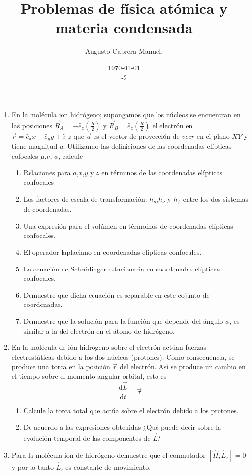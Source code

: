 \documentclass[]{article}
\title{Problemas de física atómica y materia condensada}
\author{Augusto Cabrera Manuel.}
\date{\today\\ \ser 5 \sem 2018-2 }
\begin{document}
\maketitle
\begin{enumerate}
\item En la molécula ion hidrógeno; supongamos que los núcleos se encuentran en las posiciones $\vec{R}_A=-\hat{e}_z\left(\frac{R}{2}\right)$ y $\vec{R}_B=\hat{e}_z\left(\frac{R}{2}\right)$ el electrón en $\vec{r}=\hat{e}_xx+\hat{e}_yy+\hat{e}_zz$ que $\vec{a}$ es el vector de proyección de $vec{r}$ en el plano $XY$ y tiene magnitud $a$. Utilizando las definiciones de las coordenadas elípticas cofocales $\mu$,$\nu$, $\phi$, calcule
  \begin{enumerate}
  \item Relaciones para $a$,$x$,$y$ y $z$ en términos de las coordenadas elípticas confocales
  \item Los factores de escala de transformación: $h_{\mu}$,$h_{\nu}$ y $h_{\phi}$ entre los dos sistemas de coordenadas.
  \item Una expresión para el volúmen en térmoinos de coordenadas elípticas confocales.
  \item El operador laplaciano en coordenadas elípticas confocales.
  \item La ecuación de Schrödinger estacionaria en coordenadas elípticas confocales.
  \item Demuestre que dicha ecuación es separable en este cojunto de coordenadas.
  \item Demuestre que la solución para la función que depende del ángulo $\phi$, es similar a la del electrón en el átomo de hidrógeno.
  \end{enumerate}
\item En la molécula de ión hidrógeno sobre el electrón  actúan fuerzas electrostáticas debido a los dos núcleos (protones). Como consecuencia, se produce una torca en la posición $\vec{r}$ del electrón. Así se produce un cambio en el tiempo sobre el momento angular orbital, esto es
$$
\frac{\mathrm{d}\vec{L}}{\mathrm{d}t}=\vec{\tau}
$$
\begin{enumerate}
\item Calcule la torca total que actúa sobre el electrón debido a los protones.
\item De acuerdo a las expresiones obtenidas ¿Qué puede decir sobre la evolución temporal de las componentes de $\vec{L}$?
\end{enumerate}
\item Para la molécula ion de hidrógeno demuestre que el conmutador $\left[\hat{H},\hat{L}_z\right]=0$ y por lo tanto $\hat{L}_z$ es constante de movimiento.

\end{enumerate}
\end{document}
